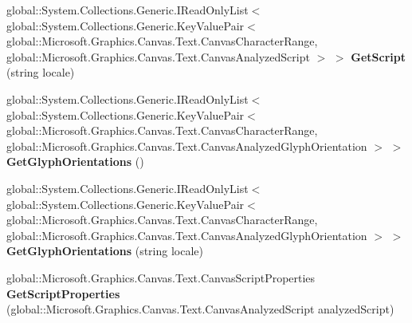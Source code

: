\begin{DoxyCompactItemize}
\item 
\mbox{\label{class_microsoft_1_1_graphics_1_1_canvas_1_1_text_1_1_canvas_text_analyzer_a211990c1225d082a3ab504974c87963b}} 
global\+::\+System.\+Collections.\+Generic.\+I\+Read\+Only\+List$<$ global\+::\+System.\+Collections.\+Generic.\+Key\+Value\+Pair$<$ global\+::\+Microsoft.\+Graphics.\+Canvas.\+Text.\+Canvas\+Character\+Range, global\+::\+Microsoft.\+Graphics.\+Canvas.\+Text.\+Canvas\+Analyzed\+Script $>$ $>$ {\bfseries Get\+Script} (string locale)
\item 
\mbox{\label{class_microsoft_1_1_graphics_1_1_canvas_1_1_text_1_1_canvas_text_analyzer_afbf85c9284d7c890f62052a14192996c}} 
global\+::\+System.\+Collections.\+Generic.\+I\+Read\+Only\+List$<$ global\+::\+System.\+Collections.\+Generic.\+Key\+Value\+Pair$<$ global\+::\+Microsoft.\+Graphics.\+Canvas.\+Text.\+Canvas\+Character\+Range, global\+::\+Microsoft.\+Graphics.\+Canvas.\+Text.\+Canvas\+Analyzed\+Glyph\+Orientation $>$ $>$ {\bfseries Get\+Glyph\+Orientations} ()
\item 
\mbox{\label{class_microsoft_1_1_graphics_1_1_canvas_1_1_text_1_1_canvas_text_analyzer_a5d9bd343724b86e778507b295082ef00}} 
global\+::\+System.\+Collections.\+Generic.\+I\+Read\+Only\+List$<$ global\+::\+System.\+Collections.\+Generic.\+Key\+Value\+Pair$<$ global\+::\+Microsoft.\+Graphics.\+Canvas.\+Text.\+Canvas\+Character\+Range, global\+::\+Microsoft.\+Graphics.\+Canvas.\+Text.\+Canvas\+Analyzed\+Glyph\+Orientation $>$ $>$ {\bfseries Get\+Glyph\+Orientations} (string locale)
\item 
\mbox{\label{class_microsoft_1_1_graphics_1_1_canvas_1_1_text_1_1_canvas_text_analyzer_a523f4325687e72e2b6f23ffbf0876b73}} 
global\+::\+Microsoft.\+Graphics.\+Canvas.\+Text.\+Canvas\+Script\+Properties {\bfseries Get\+Script\+Properties} (global\+::\+Microsoft.\+Graphics.\+Canvas.\+Text.\+Canvas\+Analyzed\+Script analyzed\+Script)
\item 
\mbox{\label{class_microsoft_1_1_graphics_1_1_canvas_1_1_text_1_1_canvas_text_analyzer_ac117d4010da0dcaf5afcc757320c6f8f}} 

\end{DoxyCompactItemize}
